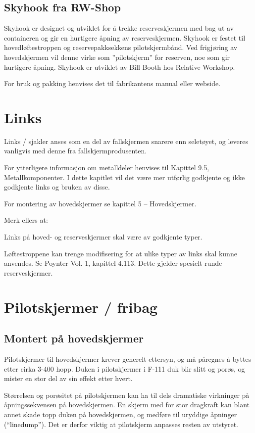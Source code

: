 \subsection{Skyhook fra RW-Shop}
Skyhook er designet og utviklet for å trekke reserveskjermen med bag ut av containeren og gir en hurtigere åpning av reserveskjermen. Skyhook er festet til hovedløftestroppen og reservepakksekkens pilotskjermbånd. Ved frigjøring av hovedskjermen vil denne virke som ”pilotskjerm” for reserven, noe som gir hurtigere åpning. Skyhook er utviklet av Bill Booth hos Relative Workshop.

For bruk og pakking henvises det til fabrikantens manual eller webside.

\section{Links}
Links / sjakler anses som en del av fallskjermen snarere enn seletøyet, og leveres vanligvis med denne fra fallskjermprodusenten.

For ytterligere informasjon om metalldeler henvises til Kapittel 9.5, Metallkomponenter. I dette kapitlet vil det være mer utførlig godkjente og ikke godkjente links og bruken av disse.

For montering av hovedskjermer se kapittel 5 – Hovedskjermer.

Merk ellers at:

Links på hoved- og reserveskjermer skal være av godkjente typer.

Løftestroppene kan trenge modifisering for at ulike typer av links skal kunne anvendes. Se Poynter Vol. 1, kapittel 4.113. Dette gjelder spesielt runde reserveskjermer.

\section{Pilotskjermer / fribag}
\subsection{Montert på hovedskjermer}
Pilotskjermer til hovedskjermer krever generelt ettersyn, og må påregnes å byttes etter cirka 3-400 hopp. Duken i pilotskjermer i F-111 duk blir slitt og porøs, og mister en stor del av sin effekt etter hvert.

Størrelsen og porøsitet på pilotskjermen kan ha til dels dramatiske virkninger på åpningssekvensen på hovedskjermen. En skjerm med for stor dragkraft kan blant annet skade topp duken på hovedskjermen, og medføre til uryddige åpninger (``linedump''). Det er derfor viktig at pilotskjerm anpasses resten av utstyret.

